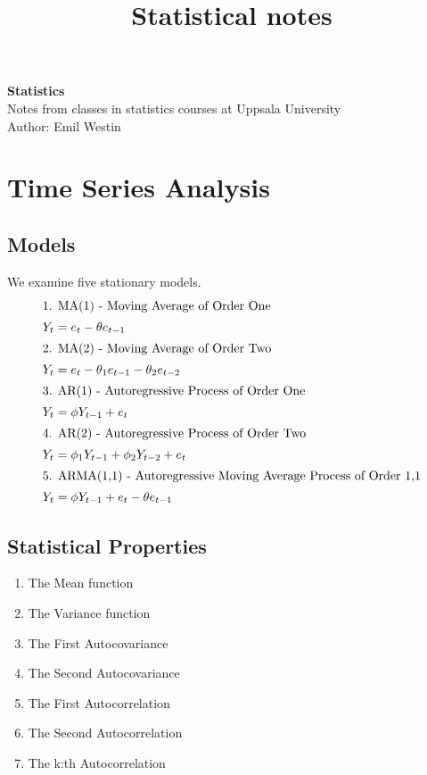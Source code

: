 \documentclass[11pt]{article}
\begin{document}
\title{Statistical notes}

\thispagestyle{empty}

\begin{center}
{\LARGE \bf Statistics}\\
Notes from classes in statistics courses at Uppsala University \\
Author: Emil Westin
\end{center}

\section{Time Series Analysis}
\subsection{Models}

We examine five stationary models.
\begin{align}
\intertext{1. MA(1) - Moving Average of Order One}
Y_t & = e_t - \theta e_{t-1} \label{MA1} \\
\intertext{2. MA(2) - Moving Average of Order Two}
Y_t & = e_t - \theta_1 e_{t-1} -  \theta_2 e_{t-2} \label{MA2} \\
\intertext{3. AR(1) - Autoregressive Process of Order One}
Y_t & = \phi Y_{t-1} + e_t \label{AR1} \\
\intertext{4. AR(2) - Autoregressive Process of Order Two}
Y_t & = \phi_1 Y_{t-1} + \phi_2 Y_{t-2} + e_t \label{AR2} \\
\intertext{5. ARMA(1,1) - Autoregressive Moving Average Process of Order 1,1}
Y_t & = \phi Y_{t-1} + e_t - \theta e_{t-1} \label{ARMA} 
\end{align}

\subsection{Statistical Properties}

\begin{enumerate}
\item The Mean function
\item The Variance function
\item The First Autocovariance  
\item The Second Autocovariance  
\item The First Autocorrelation 
\item The Second Autocorrelation 
\item The k:th Autocorrelation 
\end{enumerate}
\end{document}
